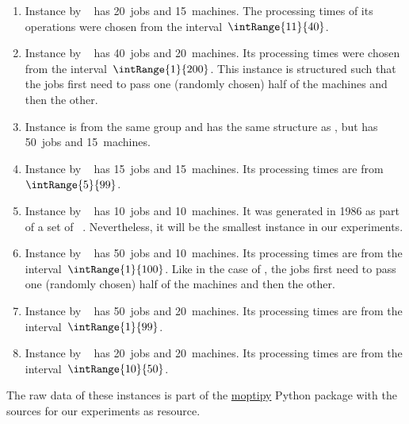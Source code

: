 \begin{enumerate}%
%
\item Instance  by \citeauthor{ABZ1988TSBPFJSS}~\cite{ABZ1988TSBPFJSS} has 20~jobs and 15~machines.
The processing times of its operations were chosen from the interval~$\intRange{11}{40}$.%
%
\item Instance  by \citeauthor{DMU1998BFSSP}~\cite{DMU1998BFSSP} has 40~jobs and 20~machines.
Its processing times were chosen from the interval~$\intRange{1}{200}$.
This instance is structured such that the jobs first need to pass one (randomly chosen) half of the machines and then the other.%
%
\item Instance  is from the same group and has the same structure as , but has 50~jobs and 15~machines.%
%
\item Instance  by \citeauthor{L1998RCPSAEIOHSTS}~\cite{L1998RCPSAEIOHSTS} has 15~jobs and 15~machines.
Its processing times are from~$\intRange{5}{99}$.%
%
\item Instance  by \citeauthor{AC1991ACSOTJSSP}~\cite{AC1991ACSOTJSSP} has 10~jobs and 10~machines.
It was generated in 1986 as part of a set of ~\cite{JM1999DJSSPPAF,H2002PJSSP}.
Nevertheless, it will be the smallest instance in our experiments.%
%
\item Instance  by \citeauthor{SWV1992NSSFSPWATJSS}~\cite{SWV1992NSSFSPWATJSS} has 50~jobs and 10~machines.
Its processing times are from the interval~$\intRange{1}{100}$.
Like in the case of , the jobs first need to pass one (randomly chosen) half of the machines and then the other.%
%
\item Instance  by \citeauthor{T1993BFBSP}~\cite{T1993BFBSP} has 50~jobs and 20~machines.
Its processing times are from the interval~$\intRange{1}{99}$.%
%
\item Instance  by \citeauthor{YN1992AGAATLSJSI}~\cite{YN1992AGAATLSJSI} has 20~jobs and 20~machines.
Its processing times are from the interval~$\intRange{10}{50}$.%
%
\end{enumerate}%
%
The raw data of these instances is part of the \href{\moptipyUrl}{moptipy} Python package with the sources for our experiments as resource.

